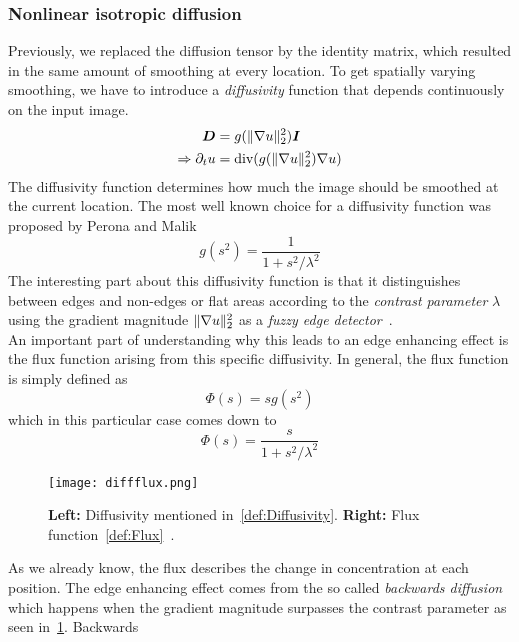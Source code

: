 \subsubsection*{Nonlinear isotropic diffusion}\label{sub:NonIsoDiff}
Previously, we replaced the diffusion tensor by the identity matrix, which resulted in the same
amount of smoothing at every location.
To get spatially varying smoothing, we have to introduce a \textit{diffusivity} function that
depends continuously on the input image. 
\begin{align}
    \boldsymbol D &= g(\lVert\mathbf{\nabla} u\rVert_2^2)\boldsymbol I\\
    \Rightarrow \partial_t u & = \textnormal{div}(g(\lVert\mathbf{\nabla}
    u\rVert_2^2)\mathbf{\nabla} u)\label{eq:NonIsoDiff}
\end{align}
The diffusivity function determines how much the image should be smoothed at the current location.
The most well known choice for a diffusivity function was proposed by Perona and Malik 
~\cite{perona-malik}
\begin{equation}
    g(s^2) = \frac{1}{1 + s^2/\lambda^2}\label{def:Diffusivity}
\end{equation}
The interesting part about this diffusivity function is that it distinguishes between edges and
non-edges or flat areas according to the \textit{contrast parameter} $\lambda$ using the gradient
magnitude $\lVert\mathbf{\nabla} u\rVert_2^2$ as a \textit{fuzzy edge detector}~\cite{dic}. \\
An important part of understanding why this leads to an edge enhancing effect is the flux function
arising from this specific diffusivity. In general, the flux function is simply defined as 
\begin{equation}
    \Phi(s) = sg(s^2)
\end{equation}
which in this particular case comes down to
\begin{equation}
    \Phi(s) =\frac{s}{1 + s^2/\lambda^2}\label{def:Flux}
\end{equation}
\begin{figure}
    \texttt{[image: diffflux.png]}
    \caption{\textbf{Left:} Diffusivity mentioned in~\eqref{def:Diffusivity}. \textbf{Right:} Flux
    function~\eqref{def:Flux}~\cite{dic}.}\label{fig:DiffFlux}
\end{figure}
As we already know, the flux describes the change in concentration at each position. The edge
enhancing effect comes from the so called \textit{backwards diffusion} which happens when the
gradient magnitude surpasses the contrast parameter as seen in~\ref{fig:DiffFlux}. Backwards
